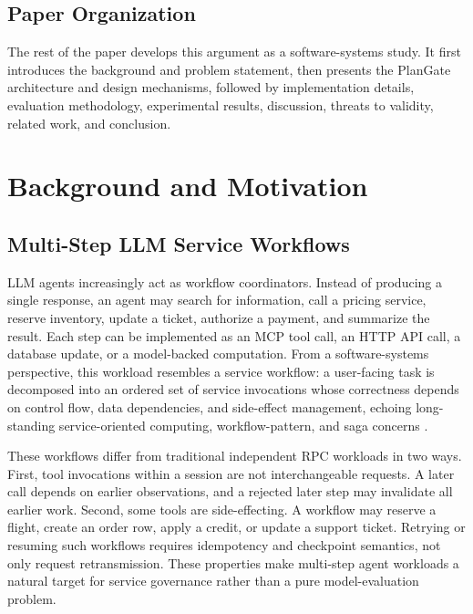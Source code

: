 \documentclass[5p,times]{elsarticle}
\begin{document}
\subsection{Paper Organization}

The rest of the paper develops this argument as a software-systems study. It first introduces the background and problem statement, then presents the PlanGate architecture and design mechanisms, followed by implementation details, evaluation methodology, experimental results, discussion, threats to validity, related work, and conclusion.

\section{Background and Motivation}
\label{sec:background}

\subsection{Multi-Step LLM Service Workflows}

LLM agents increasingly act as workflow coordinators. Instead of producing a single response, an agent may search for information, call a pricing service, reserve inventory, update a ticket, authorize a payment, and summarize the result. Each step can be implemented as an MCP tool call, an HTTP API call, a database update, or a model-backed computation. From a software-systems perspective, this workload resembles a service workflow: a user-facing task is decomposed into an ordered set of service invocations whose correctness depends on control flow, data dependencies, and side-effect management, echoing long-standing service-oriented computing, workflow-pattern, and saga concerns \citep{papazoglou2003soc,papazoglou2008roadmap,vanderAalst2003workflowpatterns,garciamolina1987sagas}.

These workflows differ from traditional independent RPC workloads in two ways. First, tool invocations within a session are not interchangeable requests. A later call depends on earlier observations, and a rejected later step may invalidate all earlier work. Second, some tools are side-effecting. A workflow may reserve a flight, create an order row, apply a credit, or update a support ticket. Retrying or resuming such workflows requires idempotency and checkpoint semantics, not only request retransmission. These properties make multi-step agent workloads a natural target for service governance rather than a pure model-evaluation problem.
\end{document}
